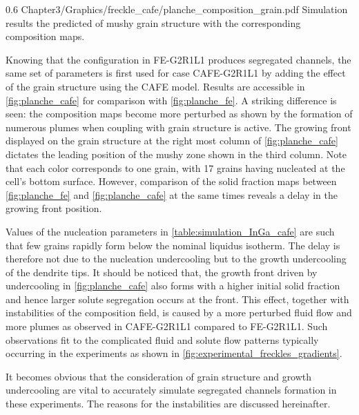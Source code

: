 %
\begin{figureth}
{0.6}
{Chapter3/Graphics/freckle_cafe/planche_composition_grain.pdf}
{Simulation results the predicted of mushy grain structure with the corresponding composition maps.}
\label{fig:planche_composition_grain}
\end{figureth}
%
Knowing that the configuration in FE-G2R1L1 produces segregated channels, the same set of parameters is first used 
for case CAFE-G2R1L1 by adding the effect of the grain structure using the CAFE model. Results are accessible 
in \cref{fig:planche_cafe} for comparison with \cref{fig:planche_fe}. A striking difference is seen: the composition maps become more 
perturbed as shown by the formation of numerous plumes when coupling with grain structure is active. The growing 
front displayed on the grain structure at the right most column of \cref{fig:planche_cafe} dictates the leading position of the 
mushy zone shown in the third column. Note that each color corresponds to one grain, with 17 grains having nucleated 
at the cell’s bottom surface. However, comparison of the solid fraction maps between \cref{fig:planche_fe} and \cref{fig:planche_cafe} at the 
same times reveals a delay in the growing front position. 

Values of the nucleation parameters in \cref{table:simulation_InGa_cafe} are such 
that few grains rapidly form below the nominal liquidus isotherm. The delay is therefore not due to the nucleation 
undercooling but to the growth undercooling of the dendrite tips. It should be noticed that, the growth front driven 
by undercooling in \cref{fig:planche_cafe} also forms with a higher initial solid fraction and hence larger solute segregation occurs 
at the front. This effect, together with instabilities of the composition field, is caused by a more perturbed fluid flow 
and more plumes as observed in CAFE-G2R1L1 compared to FE-G2R1L1. Such observations fit to the complicated fluid and solute 
flow patterns typically occurring in the experiments as shown in \cref{fig:experimental_freckles_gradients}. 

It becomes obvious that the consideration of grain 
structure and growth undercooling are vital to accurately simulate segregated channels formation in these experiments. The reasons for the 
instabilities are discussed hereinafter. 


